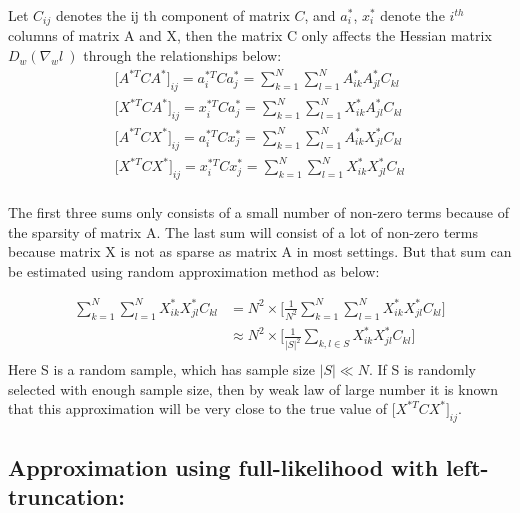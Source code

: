 \documentclass[]{article}
\begin{document}
Let \(C_{ij}\) denotes the ij th component of matrix \(C\), and
\(a_i^*\), \(x_i^*\) denote the \(i^{th}\) columns of matrix A and X,
then the matrix C only affects the Hessian matrix \(D_w(\nabla_w l\ )\)
through the relationships below:
\begin{equation}\begin{aligned}\label{eqn:EstimationMethod1forCross}
\bigg[A^{*T} C A^* \bigg]_{ij} = a_i^{*T} C a_j^* = \sum_{k=1}^{N} \sum_{l=1}^{N} A_{ik}^* A_{jl}^* C_{kl} \\
\bigg[X^{*T} C A^* \bigg]_{ij} = x_i^{*T} C a_j^* = \sum_{k=1}^{N} \sum_{l=1}^{N} X_{ik}^* A_{jl}^* C_{kl} \\
\bigg[A^{*T} C X^* \bigg]_{ij} = a_i^{*T} C x_j^* = \sum_{k=1}^{N} \sum_{l=1}^{N} A_{ik}^* X_{jl}^* C_{kl} \\
\bigg[X^{*T} C X^* \bigg]_{ij} = x_i^{*T} C x_j^* = \sum_{k=1}^{N} \sum_{l=1}^{N} X_{ik}^* X_{jl}^* C_{kl} \\
\end{aligned}\end{equation}

The first three sums only consists of a small number of non-zero terms
because of the sparsity of matrix A. The last sum will consist of a lot
of non-zero terms because matrix X is not as sparse as matrix A in most
settings. But that sum can be estimated using random approximation
method as below:

\begin{equation}\begin{aligned}\label{eqn:RandomApproxi}
\sum_{k=1}^{N} \sum_{l=1}^{N} X_{ik}^* X_{jl}^* C_{kl} &= N^2 \times \bigg[\frac{1}{N^2}\sum_{k=1}^{N} \sum_{l=1}^{N} X_{ik}^* X_{jl}^* C_{kl}\bigg] \\
                                                       &\approx N^2 \times \bigg[\frac{1}{|S|^2}\sum_{k,l \in S}^{} X_{ik}^* X_{jl}^* C_{kl}\bigg] \\
\end{aligned}\end{equation} Here S is a random sample, which has sample
size \(|S|\ll N\). If S is randomly selected with enough sample size,
then by weak law of large number it is known that this approximation
will be very close to the true value of \(\big[X^{*T}CX^{*}\big]_{ij}\).

\hypertarget{approximation-using-full-likelihood-with-left-truncation}{%
\subsection{Approximation using full-likelihood with
left-truncation:}\label{approximation-using-full-likelihood-with-left-truncation}}
\end{document}

